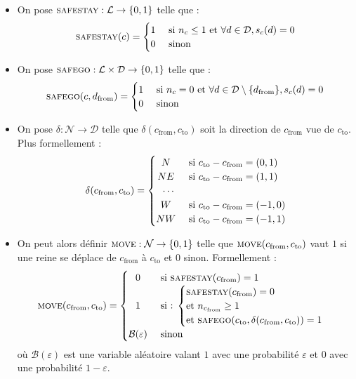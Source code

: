 \documentclass[11pt, openany]{article}
\newcommand{\La}{\mathcal{L}}
\newcommand{\Ne}{\mathcal{N}}
\newcommand{\D}{\mathcal{D}}
\newcommand{\Ss}{\textsc{safestay}}
\newcommand{\Sg}{\textsc{safego}}
\newcommand{\M}{\textsc{move}}
\begin{document}
 \begin{itemize}
  \item{On pose $\Ss : {\La}\to\{0,1\}$ telle que : \[
 \Ss(c) =
  \begin{cases} 
      \hfill 1    \hfill & \text{ si $n_c\leq 1$ et $\forall d \in \D, s_c(d)=0$} \\
      \hfill 0 \hfill & \text{ sinon} \\
  \end{cases}
\]}
  \item{On pose $\Sg :  {\La\times\D}\to\{0,1\}$ telle que : \[
 \Sg(c, d_{\mathrm {from}}) =
  \begin{cases} 
      \hfill 1    \hfill & \text{ si $n_c=0$ et $\forall d \in \D\setminus\{d_{\mathrm{from}}\}, s_c(d)=0$} \\
      \hfill 0 \hfill & \text{ sinon} \\
  \end{cases}
\]
}

  \item{On pose $\delta :\Ne\to\D$ telle que $\delta(c_{\mathrm{from}}, c_{\mathrm{to}})$ soit la direction de $c_{\mathrm{from}}$ vue de $c_{\mathrm{to}}$. Plus formellement : \[
 \delta(c_{\mathrm{from}}, c_{\mathrm{to}}) =
  \begin{cases} 
      \hfill N    \hfill & \text{ si $c_{\mathrm{to}}-c_{\mathrm{from}}=(0,1)$} \\
      \hfill NE \hfill & \text{ si  $c_{\mathrm{to}}-c_{\mathrm{from}}=(1,1)$} \\
      \hfill \cdots & \\
      \hfill W \hfill & \text{ si  $c_{\mathrm{to}}-c_{\mathrm{from}}= (-1,0)$}\\
      \hfill NW \hfill & \text { si  $c_{\mathrm{to}}-c_{\mathrm{from}}=(-1,1)$}\\
  \end{cases}
\] }
  \item{On peut alors définir $\M :{\Ne}\to\{0,1\}$ telle que $\M(c_{\mathrm{from}}, c_{\mathrm{to}})$ vaut $1$ si une reine se déplace de $c_{\mathrm{from}}$ à $c_{\mathrm{to}}$ et $0$ sinon. Formellement : \[
    \M(c_{\mathrm{from}}, c_{\mathrm{to}}) = 
    \begin{cases}
      \hfill 0 \hfill & \text{ si $\Ss(c_{\mathrm{from}})=1$} \\
      \hfill 1 \hfill & \text{ si : }{ \begin{cases} \Ss(c_{\mathrm{from}})=0 \\\text{et $n_{c_{\mathrm{from}}}\geq 1$} \\ \text{et } \Sg(c_{\mathrm{to}}, \delta(c_{\mathrm{from}}, c_{\mathrm{to}}))=1\\ \end{cases}}\\

      \hfill \mathcal{B}(\varepsilon)\hfill  & \text{ sinon} \\
    \end{cases}
\]
où $\mathcal{B}(\varepsilon)$ est une variable aléatoire valant $1$ avec une probabilité $\varepsilon$ et $0$ avec une probabilité $1-\varepsilon$.
}


\end{itemize}
\end{document}
